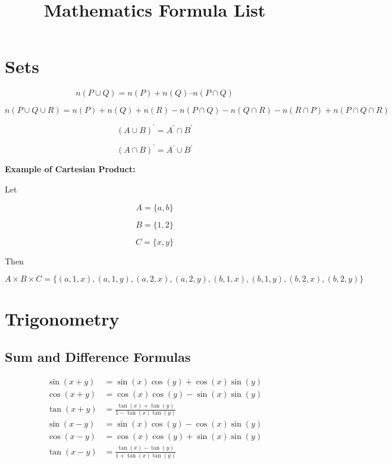 \documentclass{article}
\title{Mathematics Formula List}
\author{}
\date{}
\begin{document}
\maketitle

\section{Sets}

\begin{equation}
n(P \cup Q) = n(P) + n(Q) – n(P \cap Q)
\end{equation}

\begin{equation}
n(P \cup Q \cup R) = n(P) + n(Q) + n(R) - n(P \cap Q) - n(Q \cap R) - n(R \cap P) + n(P \cap Q \cap R)
\end{equation}

\begin{equation}
(A \cup B)^{'} = A^{'} \cap B^{'}
\end{equation}

\begin{equation}
(A \cap B)^{'} = A^{'} \cup B^{'}
\end{equation}

\textbf{Example of Cartesian Product:}

Let

\[
A = \{a, b\}
\]

\[
B = \{1, 2\}
\]

\[
C = \{x, y\}
\]

Then

\[
A \times B \times C = \{(a, 1, x), (a, 1, y), (a, 2, x), (a, 2, y), (b, 1, x), (b, 1, y), (b, 2, x), (b, 2, y)\}
\]

\section{Trigonometry}

\subsection{Sum and Difference Formulas}

\begin{align}
\sin(x+y) &= \sin(x)\cos(y) + \cos(x)\sin(y) \\
\cos(x+y) &= \cos(x)\cos(y) - \sin(x)\sin(y) \\
\tan(x+y) &= \frac{\tan(x)+\tan(y)}{1-\tan(x)\tan(y)} \\
\sin(x-y) &= \sin(x)\cos(y) - \cos(x)\sin(y) \\
\cos(x-y) &= \cos(x)\cos(y) + \sin(x)\sin(y) \\
\tan(x-y) &= \frac{\tan(x)-\tan(y)}{1+\tan(x)\tan(y)}
\end{align}
\end{document}
